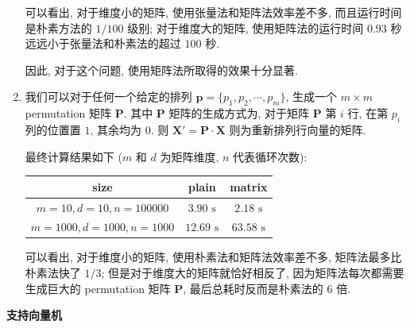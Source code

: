 \documentclass[answers]{exam}  %
\begin{document}
\begin{questions}
\begin{solution}
\begin{enumerate}
            可以看出, 对于维度小的矩阵, 使用张量法和矩阵法效率差不多, 而且运行时间是朴素方法的 $1 / 100$ 级别; 对于维度大的矩阵, 使用矩阵法的运行时间 $0.93$ 秒远远小于张量法和朴素法的超过 $100$ 秒.

            因此, 对于这个问题, 使用矩阵法所取得的效果十分显著.

      \item

            我们可以对于任何一个给定的排列 $\bm{p} = \{ p_1, p_2, \cdots, p_m \}$, 生成一个 $m \times m$ permutation 矩阵 $\bm{P}$. 其中 $\bm{P}$ 矩阵的生成方式为, 对于矩阵 $\bm{P}$ 第 $i$ 行, 在第 $p_i$ 列的位置置 $1$, 其余均为 $0$. 则 $\bm{X}' = \bm{P} \cdot \bm{X}$ 则为重新排列行向量的矩阵.

            最终计算结果如下 ($m$ 和 $d$ 为矩阵维度, $n$ 代表循环次数):

            \begin{table}[H]
              \centering
              \begin{tabular}{ccc}
                \hline
                size                           & plain             & matrix            \\
                \hline
                $m = 10, d = 10, n = 100000$   & $3.90 \text{ s}$  & $2.18 \text{ s}$  \\
                $m = 1000, d = 1000, n = 1000$ & $12.69 \text{ s}$ & $63.58 \text{ s}$ \\
                \hline
              \end{tabular}
            \end{table}

            可以看出, 对于维度小的矩阵, 使用朴素法和矩阵法效率差不多, 矩阵法最多比朴素法快了 $1 / 3$; 但是对于维度大的矩阵就恰好相反了, 因为矩阵法每次都需要生成巨大的 permutation 矩阵 $\bm{P}$, 最后总耗时反而是朴素法的 $6$ 倍.
    \end{enumerate}
  \end{solution}


  \question [20] \textbf{支持向量机}


\end{questions}
\end{document}
